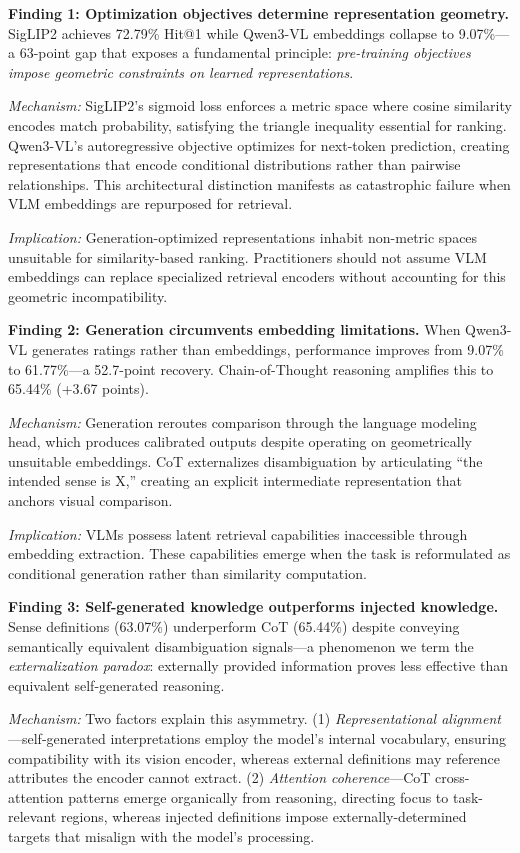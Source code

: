 \documentclass[11pt]{article}
\begin{document}
\textbf{Finding 1: Optimization objectives determine representation geometry.}
SigLIP2 achieves 72.79\% Hit@1 while Qwen3-VL embeddings collapse to 9.07\%---a 63-point gap that exposes a fundamental principle: \textit{pre-training objectives impose geometric constraints on learned representations}.

\textit{Mechanism:} SigLIP2's sigmoid loss enforces a metric space where cosine similarity encodes match probability, satisfying the triangle inequality essential for ranking. Qwen3-VL's autoregressive objective optimizes for next-token prediction, creating representations that encode conditional distributions rather than pairwise relationships. This architectural distinction manifests as catastrophic failure when VLM embeddings are repurposed for retrieval.

\textit{Implication:} Generation-optimized representations inhabit non-metric spaces unsuitable for similarity-based ranking. Practitioners should not assume VLM embeddings can replace specialized retrieval encoders without accounting for this geometric incompatibility.

\textbf{Finding 2: Generation circumvents embedding limitations.}
When Qwen3-VL generates ratings rather than embeddings, performance improves from 9.07\% to 61.77\%---a 52.7-point recovery. Chain-of-Thought reasoning amplifies this to 65.44\% (+3.67 points).

\textit{Mechanism:} Generation reroutes comparison through the language modeling head, which produces calibrated outputs despite operating on geometrically unsuitable embeddings. CoT externalizes disambiguation by articulating ``the intended sense is X,'' creating an explicit intermediate representation that anchors visual comparison.

\textit{Implication:} VLMs possess latent retrieval capabilities inaccessible through embedding extraction. These capabilities emerge when the task is reformulated as conditional generation rather than similarity computation.

\textbf{Finding 3: Self-generated knowledge outperforms injected knowledge.}
Sense definitions (63.07\%) underperform CoT (65.44\%) despite conveying semantically equivalent disambiguation signals---a phenomenon we term the \textit{externalization paradox}: externally provided information proves less effective than equivalent self-generated reasoning.

\textit{Mechanism:} Two factors explain this asymmetry. (1) \textit{Representational alignment}---self-generated interpretations employ the model's internal vocabulary, ensuring compatibility with its vision encoder, whereas external definitions may reference attributes the encoder cannot extract. (2) \textit{Attention coherence}---CoT cross-attention patterns emerge organically from reasoning, directing focus to task-relevant regions, whereas injected definitions impose externally-determined targets that misalign with the model's processing.
\end{document}
